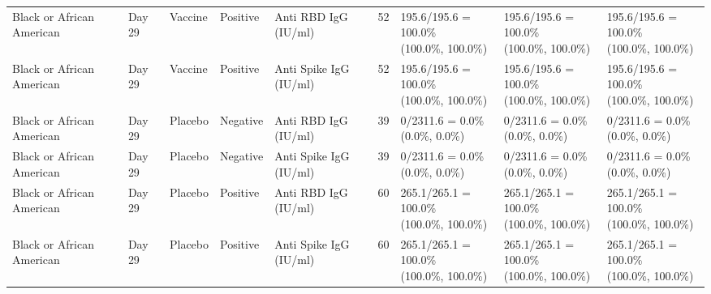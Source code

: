 \documentclass[]{book}
\theoremstyle{definition}
\theoremstyle{definition}
\theoremstyle{definition}
\newcommand{\1}{\mathbbm{1}}
\begin{document}
\begin{landscape}
\begin{ThreePartTable}
\begin{longtable}[t]{>{\raggedright\arraybackslash}p{2.7cm}llllllll}
\hspace{1em}Black or African American & Day 29 & Vaccine & Positive & Anti RBD IgG (IU/ml) & 52 & \makecell[l]{195.6/195.6 = 100.0\%\\(100.0\%, 100.0\%)} & \makecell[l]{195.6/195.6 = 100.0\%\\(100.0\%, 100.0\%)} & \makecell[l]{195.6/195.6 = 100.0\%\\(100.0\%, 100.0\%)}\\
\hspace{1em}Black or African American & Day 29 & Vaccine & Positive & Anti Spike IgG (IU/ml) & 52 & \makecell[l]{195.6/195.6 = 100.0\%\\(100.0\%, 100.0\%)} & \makecell[l]{195.6/195.6 = 100.0\%\\(100.0\%, 100.0\%)} & \makecell[l]{195.6/195.6 = 100.0\%\\(100.0\%, 100.0\%)}\\
\hspace{1em}Black or African American & Day 29 & Placebo & Negative & Anti RBD IgG (IU/ml) & 39 & \makecell[l]{0/2311.6 = 0.0\%\\(0.0\%, 0.0\%)} & \makecell[l]{0/2311.6 = 0.0\%\\(0.0\%, 0.0\%)} & \makecell[l]{0/2311.6 = 0.0\%\\(0.0\%, 0.0\%)}\\
\hspace{1em}Black or African American & Day 29 & Placebo & Negative & Anti Spike IgG (IU/ml) & 39 & \makecell[l]{0/2311.6 = 0.0\%\\(0.0\%, 0.0\%)} & \makecell[l]{0/2311.6 = 0.0\%\\(0.0\%, 0.0\%)} & \makecell[l]{0/2311.6 = 0.0\%\\(0.0\%, 0.0\%)}\\
\hspace{1em}Black or African American & Day 29 & Placebo & Positive & Anti RBD IgG (IU/ml) & 60 & \makecell[l]{265.1/265.1 = 100.0\%\\(100.0\%, 100.0\%)} & \makecell[l]{265.1/265.1 = 100.0\%\\(100.0\%, 100.0\%)} & \makecell[l]{265.1/265.1 = 100.0\%\\(100.0\%, 100.0\%)}\\
\hspace{1em}Black or African American & Day 29 & Placebo & Positive & Anti Spike IgG (IU/ml) & 60 & \makecell[l]{265.1/265.1 = 100.0\%\\(100.0\%, 100.0\%)} & \makecell[l]{265.1/265.1 = 100.0\%\\(100.0\%, 100.0\%)} & \makecell[l]{265.1/265.1 = 100.0\%\\(100.0\%, 100.0\%)}\\

\end{longtable}
\end{ThreePartTable}
\end{landscape}
\end{document}
